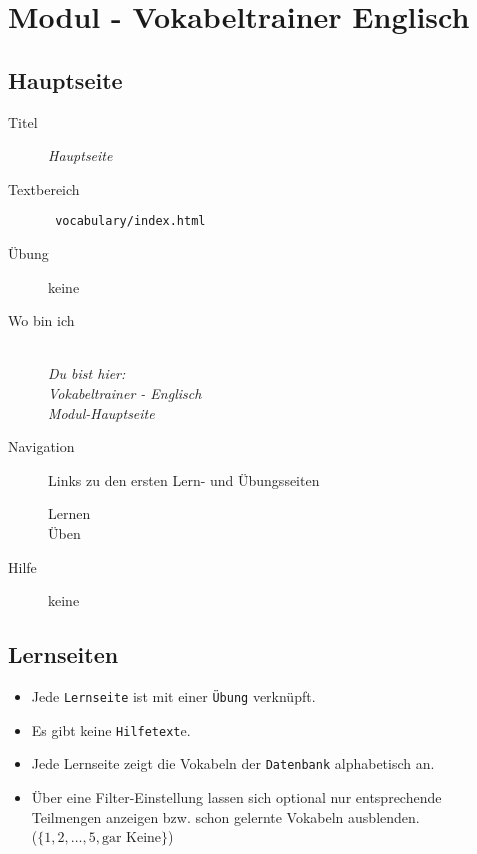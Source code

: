 \chapter{ Modul - Vokabeltrainer Englisch }
\label{has:voc-module}

\section{ Hauptseite }
\label{has:voc-module-mainpage}
\begin{description}
	\item[Titel] \emph{ Hauptseite }
	\item[Textbereich] \texttt{ vocabulary/index.html }
	\item[Übung] keine
	\item[Wo bin ich] \emph{\\Du bist hier:\\Vokabeltrainer - Englisch\\Modul-Hauptseite}
	\item[Navigation] Links zu den ersten Lern- und Übungsseiten
	\begin{description}
		\item[Lernen] 
		\item[Üben] 
	\end{description}
	\item[Hilfe] keine
\end{description}


\section{ Lernseiten }
\label{has:voc-learn}

\begin{itemize}
	\item Jede \texttt{Lernseite} ist mit einer \texttt{Übung} verknüpft.
	\item Es gibt keine \texttt{Hilfetext}e.
	\item Jede Lernseite zeigt die Vokabeln der \texttt{Datenbank} alphabetisch an.
	\item Über eine Filter-Einstellung lassen sich optional nur entsprechende Teilmengen anzeigen bzw. schon gelernte Vokabeln ausblenden. \\
		($\{1, 2, \ldots, 5, \text{gar Keine}\}$)
\end{itemize}

